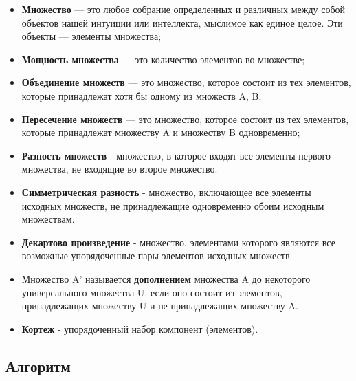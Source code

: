 \documentclass[a4paper,12pt]{extarticle}
\begin{document}
\begin{itemize}
  \item\textbf{Множество} — это любое собрание определенных и различных между собой объектов нашей интуиции или интеллекта, мыслимое как единое целое. Эти объекты — элементы множества;
  \item\textbf{Мощность множества} — это количество элементов во множестве;
  \item\textbf{Объединение множеств} — это множество, которое состоит из тех элементов, которые принадлежат хотя бы одному из множеств A, B;
  \item\textbf{Пересечение множеств} — это множество, которое состоит из тех элементов, которые  принадлежат множеству A и множеству B одновременно;
  \item\textbf{Разность множеств} - множество, в которое входят все элементы первого множества, не входящие во второе множество.
  \item\textbf{Симметрическая разность} - множество, включающее все элементы исходных множеств, не принадлежащие одновременно обоим исходным множествам.
  \item\textbf{Декартово произведение} - множество, элементами которого являются все возможные упорядоченные пары элементов исходных множеств.
  \item Множество A’ называется \textbf{дополнением} множества A до некоторого универсального множества U, если оно состоит из элементов, принадлежащих множеству U и не принадлежащих множеству A.
  \item \textbf{Кортеж} - упорядоченный набор компонент (элементов).
\end{itemize}
\begin{center}
\section*{Алгоритм}
\end{center}
\end{document}
